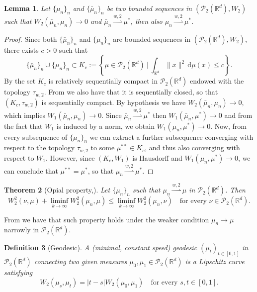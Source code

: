 \documentclass[11pt]{article}
\newtheorem{theorem}{Theorem}[section]
\newtheorem{defi}[theorem]{Definition}
\newtheorem{lemma}[theorem]{Lemma}
\newcommand{\cP}{\mathcal{P}}
\newcommand{\R}{\mathbb{R}}
\newcommand{\wsto}{\overset{w,2}{\rightharpoonup}}
\numberwithin{equation}{section}
\begin{document}
\begin{lemma}\label{lem:topology}
	Let $\{\mu_n\}_n$ and $\{\bar \mu_n\}_n$ be two bounded sequences in $(\mathcal{P}_2(\R^d),W_2)$ such that $W_2(\bar \mu_n,\mu_n)\to 0$ and $\bar \mu_n \wsto \mu^*$, then also $\mu_n\wsto \mu^*$.
\end{lemma}
\begin{proof}
	Since both $\{\bar \mu_n\}_n$ and $\{\mu_n\}_n$ are bounded sequences in $(\mathcal{P}_2(\R^d),W_2)$, there exists $c>0$ such that \[\{\bar \mu_n\}_n\cup\{\mu_n\}_n \subset K_c :=\left\{\mu \in \cP_2(\R^d) \ \big| \ \int_{\R^d} \|x\|^2 \, \mathrm{d} \mu(x) \leq c\right\}.\] 
	By \cite[Corollary 3.6 (c)]{NS2021} the set $K_c$ is relatively sequentially compact in $\cP_2(\R^d)$ endowed with the topology $\tau_{w,2}$. From \cite[Lemma 5.1.7]{AGS08} we also have that it is sequentially closed, so that $(K_c, \tau_{w,2})$ is sequentially compact. By hypothesis we have $W_2(\bar \mu_n,\mu_n)\to 0$, which implies $W_1(\bar \mu_n,\mu_n)\to 0$. Since $\bar \mu_n \wsto \mu^*$ then $W_1(\bar \mu_n,\mu^*)\to 0$ and from the fact that $W_1$ is induced by a norm, we obtain $W_1(\mu_n,\mu^*)\to 0$. Now, from every subsequence of $\{\mu_n\}_n$ we can extract a further subsequence converging with respect to the topology $\tau_{w,2}$ to some $\mu^{**} \in K_c$, and thus also converging with respect to $W_1$. However, since $(K_c,W_1)$ is Hausdorff and $W_1(\mu_n,\mu^*)\to 0$, we can conclude that $\mu^{**}=\mu^*$, so that $\mu_n \wsto \mu^*$.
\end{proof}

\begin{theorem}[Opial property,]\label{thm:Opial}
	Let $\{\mu_n\}_n$  such that $\mu_n \wsto \mu$ in $\cP_2(\R^d)$. Then
	\[W_2^2(\nu,\mu)+\liminf_{k\to \infty} W_2^2(\mu_n,\mu)\leq \liminf_{k\to \infty} W_2^2(\mu_n,\nu) \quad \text{for every } \nu \in \cP_2(\R^d).\]
\end{theorem}

From \cite[Corollary 5.3]{NS2021} we have that such property holds under the weaker condition $\mu_n \to \mu$ narrowly in $\cP_2(\R^d)$.


\begin{defi}[Geodesic]
	A (minimal, constant speed) geodesic $(\mu_t)_{t\in [0,1]}$ in $\cP_2(\R^d)$ connecting two given measures $\mu_0,\mu_1\in \cP_2(\R^d)$ is a Lipschitz curve satisfying
	\begin{equation}
		W_2(\mu_s,\mu_t)= |t-s|W_2(\mu_0,\mu_1) \quad \text{for every } s,t \in [0,1].
	\end{equation}
\end{defi}
\end{document}
